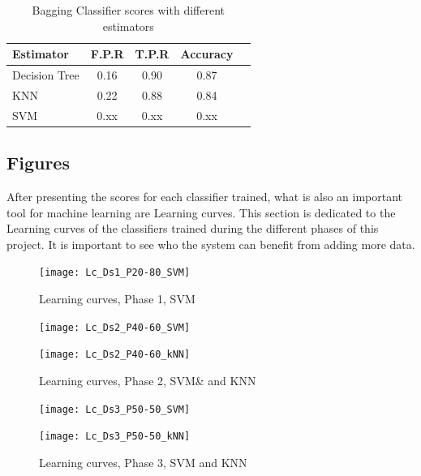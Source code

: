 \documentclass{article}
\begin{document}
\begin{table}[hb]
\caption{Bagging Classifier scores with different estimators}
\vskip 0.1in
\begin{center}
\begin{small}
\begin{sc}
\begin{tabular}{lcccr}
\hline
\abovespace
Estimator & F.P.R & T.P.R & Accuracy\\
\hline
\abovespace
Decision Tree & 0.16 & 0.90 & 0.87 \\
\hline
\abovespace
KNN & 0.22 & 0.88 & 0.84 \\
\hline
\abovespace
SVM & 0.xx & 0.xx & 0.xx \\
\hline
\end{tabular}
\end{sc}
\end{small}
\end{center}
\vskip -0.2in
\end{table}

\subsection{Figures}

After presenting the scores for each classifier trained, what is also an important tool for machine learning are Learning curves. This section is dedicated to the Learning curves of the classifiers trained during the different phases of this project. 
It is important to see who the system can benefit from adding more data. 

\begin{figure}[h]
\vskip 0.2in
\begin{center}
\centerline{\texttt{[image: Lc\_Ds1\_P20-80\_SVM]}}
\caption{Learning curves, Phase 1, SVM}
\label{learning curves}
\end{center}
\vskip -0.2in
\end{figure} 

\begin{figure}[h]
\vskip 0.2in
\begin{center}
\centerline{\texttt{[image: Lc\_Ds2\_P40-60\_SVM]}}
\centerline{\texttt{[image: Lc\_Ds2\_P40-60\_kNN]}}
\caption{Learning curves, Phase 2, SVM& and KNN}
\label{learning curves}
\end{center}
\vskip -0.2in
\end{figure} 

\begin{figure}[h]
\vskip 0.2in
\begin{center}
\centerline{\texttt{[image: Lc\_Ds3\_P50-50\_SVM]}}
\centerline{\texttt{[image: Lc\_Ds3\_P50-50\_kNN]}}
\caption{Learning curves, Phase 3, SVM and KNN}
\label{learning curves}
\end{center}
\vskip -0.2in
\end{figure} 
\end{document}
